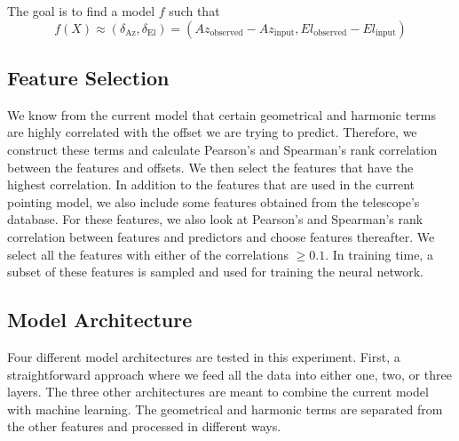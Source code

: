 The goal is to find a model $f$ such that
\begin{equation}
    f(X) \approx (\delta_{\text{Az}}, \delta_{\text{El}}) = (Az_{\text{observed}}-Az_{\text{input}}, El_{\text{observed}}-El_{\text{input}})
\end{equation}

\subsection{Feature Selection}
We know from the current model that certain geometrical and harmonic terms are highly correlated with the offset we are trying to predict.
Therefore, we construct these terms and calculate Pearson's and Spearman's rank correlation between the features and offsets.
We then select the features that have the highest correlation. In addition to the features that are used in the current pointing model,
we also include some features obtained from the telescope's database.
For these features, we also look at Pearson's and Spearman's rank correlation between features and predictors and choose features thereafter.
We select all the features with either of the correlations $\geq 0.1$. In training time, a subset of these features is sampled and used for training the neural network.

\subsection{Model Architecture}
Four different model architectures are tested in this experiment. First, a straightforward approach where we feed all the data into either one, two, or three layers.
The three other architectures are meant to combine the current model with machine learning.
The geometrical and harmonic terms are separated from the other features and processed in different ways.


